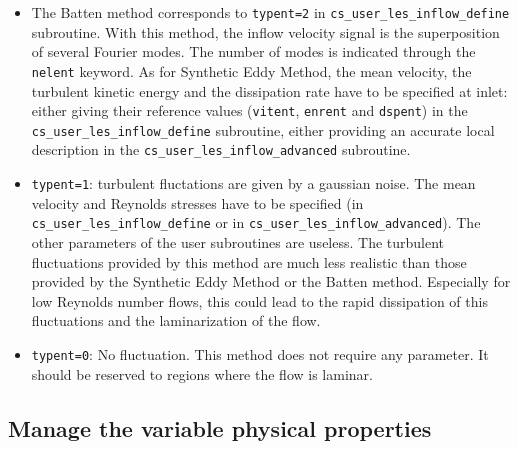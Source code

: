 {{{\begin{itemize}
\item The Batten method corresponds to \texttt{typent=2} in
  \texttt{cs\_user\_les\_inflow\_define} subroutine. With this method,
  the inflow velocity signal is the superposition of several Fourier
  modes. The number of modes is indicated through the
  \texttt{nelent} keyword. As   for Synthetic Eddy Method, the mean
  velocity, the turbulent kinetic energy and the dissipation rate have
  to be specified at inlet: either giving their reference values
  (\texttt{vitent}, \texttt{enrent} and \texttt{dspent}) in the
  \texttt{cs\_user\_les\_inflow\_define} subroutine, either providing
  an accurate local description in the
  \texttt{cs\_user\_les\_inflow\_advanced} subroutine.

\item \texttt{typent=1}: turbulent fluctations are given by a gaussian
  noise. The mean velocity and Reynolds stresses have to be specified
  (in \texttt{cs\_user\_les\_inflow\_define} or in
  \texttt{cs\_user\_les\_inflow\_advanced}). The other parameters of
  the user subroutines are useless. The turbulent fluctuations
  provided by this method are much less realistic than those provided
  by the Synthetic Eddy Method or the Batten method. Especially for
  low Reynolds number flows, this could lead to the rapid dissipation
  of this fluctuations and the laminarization of the flow.

\item \texttt{typent=0}: No fluctuation. This method does not require
  any parameter. It should be reserved to regions where the flow is
  laminar.
\end{itemize}

\subsection{Manage the variable physical properties}
}}}
